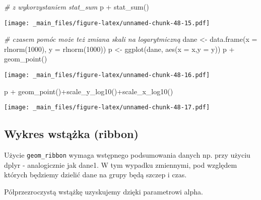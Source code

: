 \documentclass[
]{book}
\newenvironment{Shaded}{\begin{snugshade}}{\end{snugshade}}
\newcommand{\AttributeTok}[1]{\textcolor[rgb]{0.77,0.63,0.00}{#1}}
\newcommand{\CommentTok}[1]{\textcolor[rgb]{0.56,0.35,0.01}{\textit{#1}}}
\newcommand{\DecValTok}[1]{\textcolor[rgb]{0.00,0.00,0.81}{#1}}
\newcommand{\FunctionTok}[1]{\textcolor[rgb]{0.00,0.00,0.00}{#1}}
\newcommand{\NormalTok}[1]{#1}
\newcommand{\OtherTok}[1]{\textcolor[rgb]{0.56,0.35,0.01}{#1}}
\newcommand{\SpecialCharTok}[1]{\textcolor[rgb]{0.00,0.00,0.00}{#1}}
\begin{document}
\begin{Shaded}
\begin{Highlighting}[]
\CommentTok{\# z wykorzystaniem stat\_sum}
\NormalTok{p }\SpecialCharTok{+} \FunctionTok{stat\_sum}\NormalTok{()}
\end{Highlighting}
\end{Shaded}

\texttt{[image: \_main\_files/figure-latex/unnamed-chunk-48-15.pdf]}

\begin{Shaded}
\begin{Highlighting}[]
\CommentTok{\# czasem pomóc może też zmiana skali na logarytmiczną}
\NormalTok{dane }\OtherTok{\textless{}{-}} \FunctionTok{data.frame}\NormalTok{(}\AttributeTok{x =} \FunctionTok{rlnorm}\NormalTok{(}\DecValTok{1000}\NormalTok{), }\AttributeTok{y =} \FunctionTok{rlnorm}\NormalTok{(}\DecValTok{1000}\NormalTok{))}
\NormalTok{p }\OtherTok{\textless{}{-}} \FunctionTok{ggplot}\NormalTok{(dane, }\FunctionTok{aes}\NormalTok{(}\AttributeTok{x =}\NormalTok{ x,}\AttributeTok{y =}\NormalTok{ y))}
\NormalTok{p }\SpecialCharTok{+} \FunctionTok{geom\_point}\NormalTok{()}
\end{Highlighting}
\end{Shaded}

\texttt{[image: \_main\_files/figure-latex/unnamed-chunk-48-16.pdf]}

\begin{Shaded}
\begin{Highlighting}[]
\NormalTok{p }\SpecialCharTok{+} \FunctionTok{geom\_point}\NormalTok{()}\SpecialCharTok{+}\FunctionTok{scale\_y\_log10}\NormalTok{()}\SpecialCharTok{+}\FunctionTok{scale\_x\_log10}\NormalTok{()}
\end{Highlighting}
\end{Shaded}

\texttt{[image: \_main\_files/figure-latex/unnamed-chunk-48-17.pdf]}

\hypertarget{wykres-wstux105ux17cka-ribbon}{%
\subsection{Wykres wstążka (ribbon)}\label{wykres-wstux105ux17cka-ribbon}}

Użycie \texttt{geom\_ribbon} wymaga wstępnego podsumowania danych np. przy użyciu dplyr - analogicznie jak dane1. W tym wypadku zmiennymi, pod względem których będziemy dzielić dane na grupy będą szczep i czas.

Półprzezroczystą wstążkę uzyskujemy dzięki parametrowi alpha.
\end{document}
